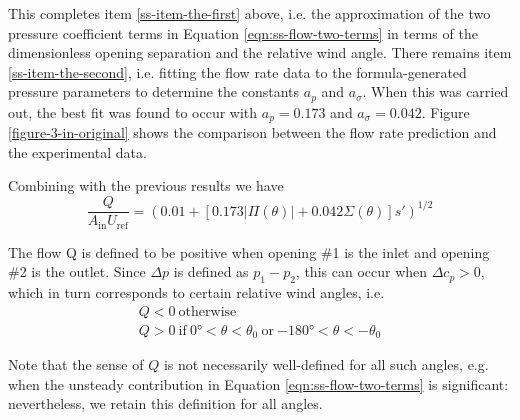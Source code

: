 This completes item \ref{ss-item-the-first} above, i.e. the approximation of the two pressure coefficient terms in Equation \ref{eqn:ss-flow-two-terms} in terms of the dimensionless opening separation and the relative wind angle. There remains item \ref{ss-item-the-second}, i.e. fitting the flow rate data to the formula-generated pressure parameters to determine the constants $a_p$ and $a_\sigma$. When this was carried out, the best fit was found to occur with $a_p = 0.173$ and $a_\sigma = 0.042$. Figure \ref{figure-3-in-original} shows the comparison between the flow rate prediction and the experimental data.

Combining with the previous results we have
\begin{equation}\label{eqn:ss-combined-eqn}
\frac{Q}{A_\text{in} U_\text{ref}}=\left(0.01+\left[0.173 |\Pi(\theta)|+0.042 \Sigma(\theta)\right]s'\right)^{1/2}
\end{equation}

The flow Q is defined to be positive when opening \#1 is the inlet and opening \#2 is the outlet. Since $\Delta p$ is defined as $p_1-p_2$, this can occur when $\Delta c_p > 0$, which in turn corresponds to certain relative wind angles, i.e.
\begin{equation}
\begin{gathered}
Q < 0\ \text{otherwise}\\ 			
Q > 0\ \text{if}\ \ang{0} < \theta < \theta_0\ \text{or}\  \ang{-180} < \theta < -\theta_0
\end{gathered}
\end{equation}

Note that the sense of $Q$ is not necessarily well-defined for all such angles, e.g.
when the unsteady contribution in Equation \ref{eqn:ss-flow-two-terms} is significant:
nevertheless, we retain this definition for all angles.

